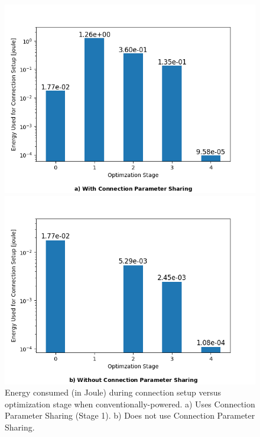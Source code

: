 \begin{figure}[]
    \centering
    \begin{minipage}[b]{0.47\textwidth}
      \includegraphics[width=\textwidth]{plots/static_power_consumption_conventional.png}
    \end{minipage}
    \hfill
    \begin{minipage}[b]{0.47\textwidth}
        \includegraphics[width=\textwidth]{plots/static_power_consumption_conventional_fast.png}
    \end{minipage}
    \caption{Energy consumed (in Joule) during connection setup versus optimization stage when conventionally-powered. a) Uses Connection Parameter Sharing (Stage 1). b) Does not use Connection Parameter Sharing.}
    \label{fig:static_power_consumption_conventional}
\end{figure}

